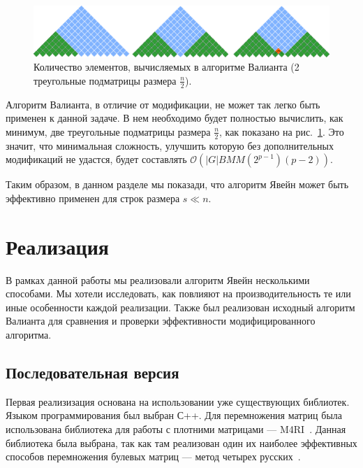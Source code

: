 \documentclass[14pt]{matmex-diploma-custom}
\begin{document}
\begin{figure}[h]
\vspace{3mm}
 \begin{center}
 \includegraphics[width=14cm]{valsubstring.pdf}
    \caption{Количество элементов, вычисляемых в алгоритме Валианта (2 треугольные подматрицы размера $\frac{n}{2}$).}
    \label{fig5}
 \end{center}
\vspace{-8mm}
\end{figure}

Алгоритм Валианта, в отличие от модификации, не может так легко быть применен к данной задаче. В нем необходимо будет полностью вычислить, как минимум, две треугольные подматрицы размера $\frac{n}{2}$, как показано на рис.~\ref{fig5}.
Это значит, что минимальная сложность, улучшить которую без дополнительных модификаций не удастся, будет составлять $\mathcal{O}(|G|BMM(2^{p - 1})(p - 2))$.

Таким образом, в данном разделе мы показади, что алгоритм Явейн может быть эффективно применен для строк размера $s \ll n$.



\section{Реализация}

В рамках данной работы мы реализовали алгоритм Явейн несколькими способами. Мы хотели исследовать, как повлияют на производительность те или иные особенности каждой реализации. Также был реализован исходный алгоритм Валианта для сравнения и проверки эффективности модифицированного алгоритма.

\subsection{Последовательная версия}

Первая реализизация основана на использовании уже существующих библиотек. 
Языком программирования был выбран С++. Для перемножения матриц была использована библиотека для работы с плотними матрицами --- M4RI~\cite{M4RI}. 
Данная библиотека была выбрана, так как там реализован один их наиболее эффективных способов перемножения булевых матриц --- метод четырех русских~\cite{arlazarov1970economical, albrechtefficient}.  
\end{document}
